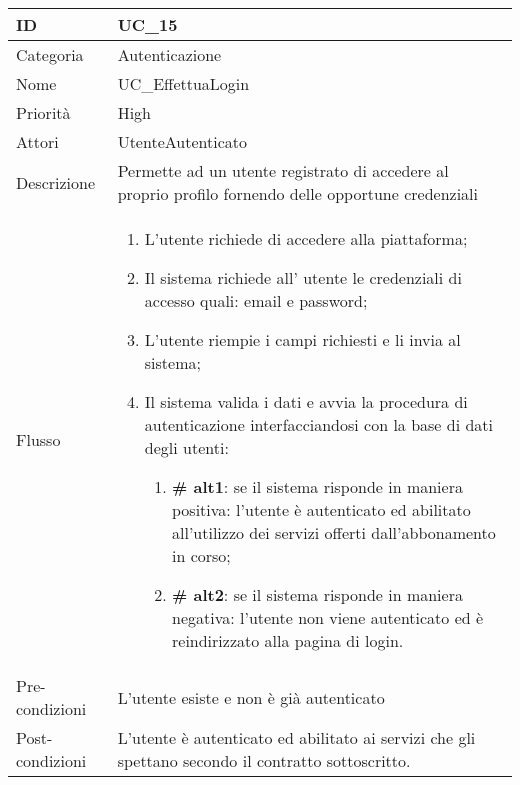 \begin{center}
\begin{tabular}{ |p{2cm}|p{13cm}|  }
\hline
ID & UC\_15 \\\hline
Categoria & Autenticazione \\\hline
Nome & UC\_EffettuaLogin \\\hline
Priorità & High \\\hline
Attori &  UtenteAutenticato \\\hline
Descrizione & Permette ad un utente registrato di accedere al proprio profilo fornendo delle opportune credenziali \\\hline
Flusso &  	\begin{enumerate}
			\item L'utente richiede di accedere alla piattaforma;
			\item Il sistema richiede all' utente le credenziali di accesso quali: email e password;
			\item L'utente riempie i campi richiesti e li invia al sistema;
			\item Il sistema valida i dati e avvia la procedura di autenticazione interfacciandosi con la base di dati degli utenti:
			\begin{enumerate}[  ]
				\item \textbf{\# alt1}: se il sistema risponde in maniera positiva: l'utente è autenticato ed abilitato all'utilizzo dei servizi offerti dall'abbonamento in corso; 
				\item \textbf{\# alt2}: se il sistema risponde in maniera negativa: l'utente non viene autenticato ed è reindirizzato alla pagina di login.
			\end{enumerate}
		\end{enumerate}\\\hline
Pre-condizioni &  L'utente esiste e non è già autenticato\\\hline
Post-condizioni &  L'utente è autenticato ed abilitato ai servizi che gli spettano secondo il contratto sottoscritto.\\\hline
\end{tabular}
\label{table_use_case:15}\newline


\end{center}
